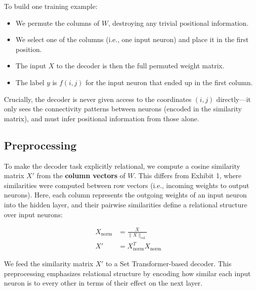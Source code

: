 \documentclass[11pt]{article}
\begin{document}
To build one training example:

\begin{itemize}
\item We permute the columns of $W$, destroying any trivial positional information.
\item We select one of the columns (i.e., one input neuron) and place it in the first position.
\item The input $X$ to the decoder is then the full permuted weight matrix.
\item The label $y$ is $f(i, j)$ for the input neuron that ended up in the first column.
\end{itemize}

Crucially, the decoder is never given access to the coordinates $(i, j)$ directly—it only sees the connectivity patterns between neurons (encoded in the similarity matrix), and must infer positional information from those alone.

\subsection{Preprocessing}

To make the decoder task explicitly relational, we compute a cosine similarity matrix $X'$ from the \textbf{column vectors} of $W$. This differs from Exhibit 1, where similarities were computed between row vectors (i.e., incoming weights to output neurons). Here, each column represents the outgoing weights of an input neuron into the hidden layer, and their pairwise similarities define a relational structure over input neurons:

\begin{align}
X_{\text{norm}} &= \frac{X}{\|X\|_{\text{col}}} \\
X' &= X_{\text{norm}}^T X_{\text{norm}}
\end{align}

We feed the similarity matrix $X'$ to a Set Transformer-based decoder. This preprocessing emphasizes relational structure by encoding how similar each input neuron is to every other in terms of their effect on the next layer.
\end{document}
